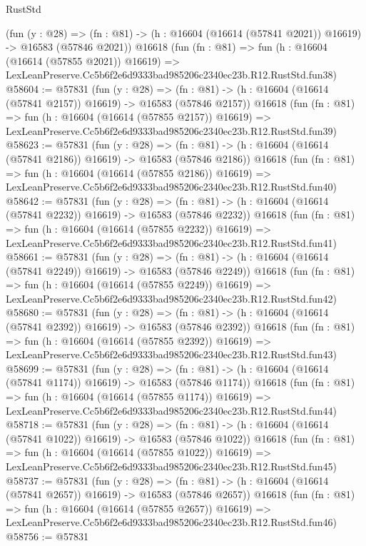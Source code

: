 \begin{lexlean}{RustStd}
\begin{coremodule}
    (fun (y : @28) =>
    (fn : @81) -> (h : @16604 (@16614 (@57841 @2021)) @16619) -> @16583 (@57846 @2021))
    @16618
    (fun (fn : @81) =>
    fun (h : @16604 (@16614 (@57855 @2021)) @16619) =>
    LexLeanPreserve.Cc5b6f2e6d9333bad985206c2340ec23b.R12.RustStd.fun38)
@58604 := @57831
    (fun (y : @28) =>
    (fn : @81) -> (h : @16604 (@16614 (@57841 @2157)) @16619) -> @16583 (@57846 @2157))
    @16618
    (fun (fn : @81) =>
    fun (h : @16604 (@16614 (@57855 @2157)) @16619) =>
    LexLeanPreserve.Cc5b6f2e6d9333bad985206c2340ec23b.R12.RustStd.fun39)
@58623 := @57831
    (fun (y : @28) =>
    (fn : @81) -> (h : @16604 (@16614 (@57841 @2186)) @16619) -> @16583 (@57846 @2186))
    @16618
    (fun (fn : @81) =>
    fun (h : @16604 (@16614 (@57855 @2186)) @16619) =>
    LexLeanPreserve.Cc5b6f2e6d9333bad985206c2340ec23b.R12.RustStd.fun40)
@58642 := @57831
    (fun (y : @28) =>
    (fn : @81) -> (h : @16604 (@16614 (@57841 @2232)) @16619) -> @16583 (@57846 @2232))
    @16618
    (fun (fn : @81) =>
    fun (h : @16604 (@16614 (@57855 @2232)) @16619) =>
    LexLeanPreserve.Cc5b6f2e6d9333bad985206c2340ec23b.R12.RustStd.fun41)
@58661 := @57831
    (fun (y : @28) =>
    (fn : @81) -> (h : @16604 (@16614 (@57841 @2249)) @16619) -> @16583 (@57846 @2249))
    @16618
    (fun (fn : @81) =>
    fun (h : @16604 (@16614 (@57855 @2249)) @16619) =>
    LexLeanPreserve.Cc5b6f2e6d9333bad985206c2340ec23b.R12.RustStd.fun42)
@58680 := @57831
    (fun (y : @28) =>
    (fn : @81) -> (h : @16604 (@16614 (@57841 @2392)) @16619) -> @16583 (@57846 @2392))
    @16618
    (fun (fn : @81) =>
    fun (h : @16604 (@16614 (@57855 @2392)) @16619) =>
    LexLeanPreserve.Cc5b6f2e6d9333bad985206c2340ec23b.R12.RustStd.fun43)
@58699 := @57831
    (fun (y : @28) =>
    (fn : @81) -> (h : @16604 (@16614 (@57841 @1174)) @16619) -> @16583 (@57846 @1174))
    @16618
    (fun (fn : @81) =>
    fun (h : @16604 (@16614 (@57855 @1174)) @16619) =>
    LexLeanPreserve.Cc5b6f2e6d9333bad985206c2340ec23b.R12.RustStd.fun44)
@58718 := @57831
    (fun (y : @28) =>
    (fn : @81) -> (h : @16604 (@16614 (@57841 @1022)) @16619) -> @16583 (@57846 @1022))
    @16618
    (fun (fn : @81) =>
    fun (h : @16604 (@16614 (@57855 @1022)) @16619) =>
    LexLeanPreserve.Cc5b6f2e6d9333bad985206c2340ec23b.R12.RustStd.fun45)
@58737 := @57831
    (fun (y : @28) =>
    (fn : @81) -> (h : @16604 (@16614 (@57841 @2657)) @16619) -> @16583 (@57846 @2657))
    @16618
    (fun (fn : @81) =>
    fun (h : @16604 (@16614 (@57855 @2657)) @16619) =>
    LexLeanPreserve.Cc5b6f2e6d9333bad985206c2340ec23b.R12.RustStd.fun46)
@58756 := @57831

\end{coremodule}
\end{lexlean}
